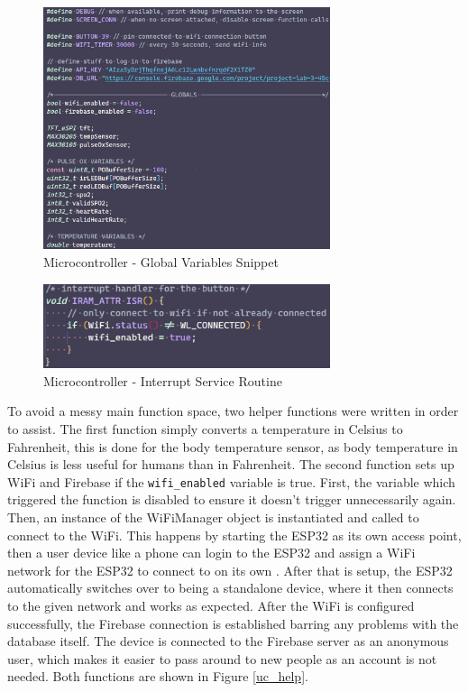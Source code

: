 \documentclass[12pt]{article}
\begin{document}
    \begin{figure}[hbt!]
        \centering
        \includegraphics[width=0.75\textwidth]{uc_globals}
        \caption{Microcontroller - Global Variables Snippet}
        \label{uc_var}
    \end{figure} 

    \begin{figure}[hbt!]
        \centering
        \includegraphics[width=0.75\textwidth]{uc_isr}
        \caption{Microcontroller - Interrupt Service Routine}
        \label{uc_isr}
    \end{figure} 

    To avoid a messy main function space, two helper functions were written in order to assist. The first function simply converts a temperature in Celsius to Fahrenheit, this is done for the body temperature sensor, as body temperature in Celsius is less useful for humans than in Fahrenheit. The second function sets up WiFi and Firebase if the \verb|wifi_enabled| variable is true. First, the variable which triggered the function is disabled to ensure it doesn't trigger unnecessarily again. Then, an instance of the WiFiManager object is instantiated and called to connect to the WiFi. This happens by starting the ESP32 as its own access point, then a user device like a phone can login to the ESP32 and assign a WiFi network for the ESP32 to connect to on its own \cite{wifi_manager}. After that is setup, the ESP32 automatically switches over to being a standalone device, where it then connects to the given network and works as expected. After the WiFi is configured successfully, the Firebase connection is established barring any problems with the database itself. The device is connected to the Firebase server as an anonymous user, which makes it easier to pass around to new people as an account is not needed. Both functions are shown in Figure \ref{uc_help}.
\end{document}
